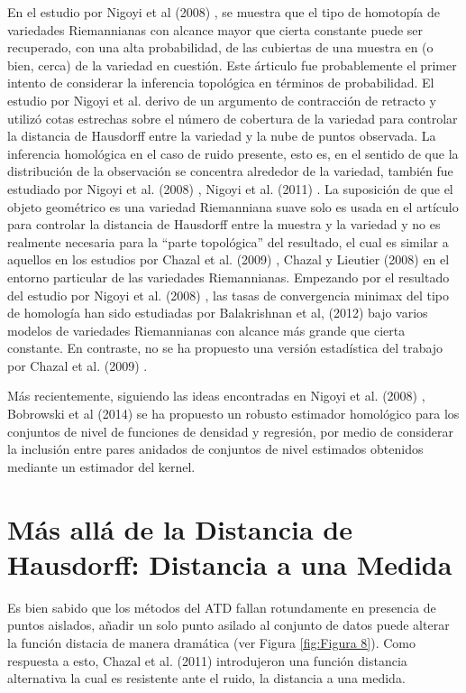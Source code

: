 En el estudio por Nigoyi et al (2008) \cite{Niyogi2008}, se muestra que el tipo de homotop\'ia de
variedades Riemannianas con alcance mayor que cierta constante puede ser recuperado, con una
alta probabilidad, de las cubiertas de una muestra en (o bien, cerca) de la variedad en cuesti\'on.
Este \'articulo fue probablemente el primer intento de considerar la inferencia topol\'ogica en t\'erminos
de probabilidad. El estudio por Nigoyi et al.\cite{Niyogi2008} derivo de un argumento de contracci\'on de
retracto y utiliz\'o cotas estrechas sobre el n\'umero de cobertura de la variedad para controlar
la distancia de Hausdorff entre la variedad y la nube de puntos observada. La inferencia homol\'ogica
en el caso de ruido presente, esto es, en el sentido de que la distribuci\'on de la observaci\'on se
concentra alrededor de la variedad, tambi\'en fue estudiado por Nigoyi et al. (2008) \cite{Niyogi2008},
Nigoyi et al. (2011) \cite{Niyogi2008}. La suposici\'on de que el objeto geom\'etrico es una variedad
Riemanniana suave solo es usada en el art\'iculo para controlar la distancia de Hausdorff entre la
muestra y la variedad y no es realmente necesaria para la ``parte topol\'ogica'' del resultado, el cual
es similar a aquellos en los estudios por Chazal et al. (2009) \cite{Chazal2009d}, Chazal y Lieutier
(2008) \cite{Chazal2008} en el entorno particular de las variedades Riemannianas. Empezando por el
resultado del estudio por Nigoyi et al. (2008) \cite{Niyogi2008}, las tasas de convergencia minimax
del tipo de homolog\'ia han sido estudiadas por Balakrishnan et al, (2012) \cite{Balakrishnan2012}
bajo varios modelos de variedades Riemannianas con alcance m\'as grande que cierta constante. En contraste, no se ha propuesto una versi\'on estad\'istica del trabajo por Chazal et al. (2009)
\cite{Chazal2009d}.

M\'as recientemente, siguiendo las ideas encontradas en Nigoyi et al. (2008) \cite{Niyogi2008},
Bobrowski et al (2014) \cite{Bobrowski2014} se ha propuesto un robusto estimador homol\'ogico para los
conjuntos de nivel de funciones de densidad y regresi\'on, por medio de considerar la inclusi\'on entre
pares anidados de conjuntos de nivel estimados obtenidos mediante un estimador del kernel.

\section{M\'as all\'a de la Distancia de Hausdorff: Distancia a una Medida}\label{sec: 3.3}

Es bien sabido que los m\'etodos del ATD fallan rotundamente en presencia de puntos aislados, a\~{n}adir
un solo punto asilado al conjunto de datos puede alterar la funci\'on distacia de manera dram\'atica
(ver Figura \ref{fig:Figura 8}). Como respuesta a esto, Chazal et al. (2011) \cite{Chazal2011b}
introdujeron una funci\'on distancia alternativa la cual es resistente ante el ruido, la distancia a una
medida.


